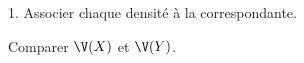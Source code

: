 \documentclass[11pt]{article}%
\begin{document}
\begin{exerciceSP}
\begin{noliste}{1.}
   Associer chaque densité à la \var correspondante.
   
   \item Comparer $\V(X)$ et $\V(Y)$.
 \end{noliste}
\end{exerciceSP}


\end{document}
